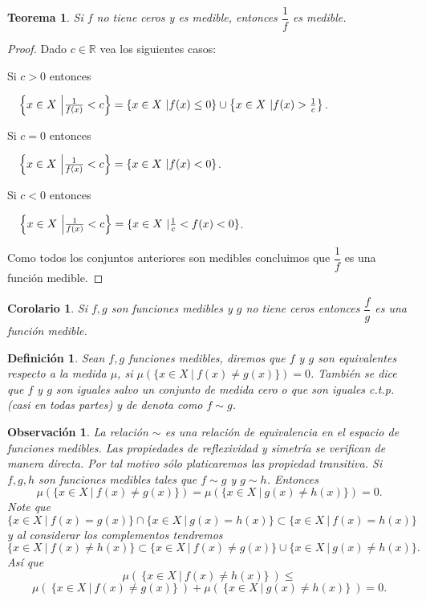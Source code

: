 \documentclass[twoside,12pt,a4 paper,openright]{book}
\newtheorem{teo}[claim]{Teorema}
\newtheorem{cor}[claim]{Corolario}
\newtheorem{defi}[claim]{Definici\'on}
\newtheorem{ob}[claim]{Observaci\'on}
\begin{document}
\begin{teo}
    Si $f$ no tiene ceros y es medible, entonces $\dfrac{1}{f}$ es medible.
\end{teo}

\begin{proof}Dado $c\in \mathbb{R}$
    vea los siguientes casos: 

    \noindent
Si $c > 0$ entonces 

 $\quad \left\{x\in X \ \Big{|} \frac{1}{f(x)}<c\right\} = \{x \in X\   |f(x)\leq 0\}\cup\left\{x \in X\   | f(x)> \frac{1}{c}\right\}$.
  
    \noindent
Si $c = 0$ entonces 

 $\quad \left\{x \in X\  \Big{|} \frac{1}{f(x)}<c\right\} = \{x \in X\  |f(x)<0\}$. 

    \noindent
Si $c < 0$ entonces 
 
  $\quad \left\{x \in X\  \Big{|} \frac{1}{f(x)}<c\right\} = \{x \in X\  |\frac{1}{c}<f(x)<0\}$.
   
Como todos los conjuntos anteriores son medibles concluimos que  $\dfrac{1}{f}$ es una funci\'on medible.
\end{proof}


\begin{cor}
    Si $f,g$ son funciones medibles y $g$ no tiene ceros entonces $\dfrac{f}{g}$ es una funci\'on medible.
\end{cor}




\begin{defi}
    Sean $f,g$ funciones medibles, diremos que $f$ y $g$ son equivalentes respecto a la medida $\mu$,  si 
    $\mu(\{x\in X \ | \  f(x)\neq g(x)\}) = 0$. Tambi\'en se dice que $f$ y $g$ son iguales salvo un conjunto de medida cero o que son iguales c.t.p. (casi en todas partes) y  de denota como  $f\sim g$.
\end{defi}



\begin{ob}
La relaci\'on $\sim$ es una relaci\'on de equivalencia en el espacio de funciones medibles. Las propiedades de reflexividad y
 simetr\'ia se verifican de manera directa. Por tal motivo s\'olo platicaremos las propiedad transitiva.   
Si $f,g,h$ son funciones medibles   tales que $f\sim g$ y $g\sim h$. Entonces 
     $$\mu(\{x\in X \ | \  f(x)\neq g(x)\}) = \mu(\{x\in X \ | \  g(x)\neq h(x)\}) = 0.$$
     Note que  
   $$\{x\in X  \ | \  f(x) = g(x)\} \cap \{x\in X  \ | \  g(x) = h(x)\} \subset \{x\in X  \ | \  f(x) = h(x)\}  $$
y al considerar los complementos tendremos 
   $$\{x\in X  \ | \  f(x) \neq h(x)\} \subset  \{x\in X  \ | \  f(x) \neq g(x)\} \cup  \{x\in X  \ | \  g(x) \neq  h(x)\} .$$
As\'i que 
$$\mu ( \  \{x\in X  \ | \  f(x) \neq h(x)\} \ ) \leq $$
$$\mu ( \ \{x\in X  \ | \  f(x) \neq g(x)\} \ ) + \mu ( \   \{x\in X  \ | \  g(x) \neq  h(x)\} \ ) =0 .$$
 
     
\end{ob}
\end{document}
